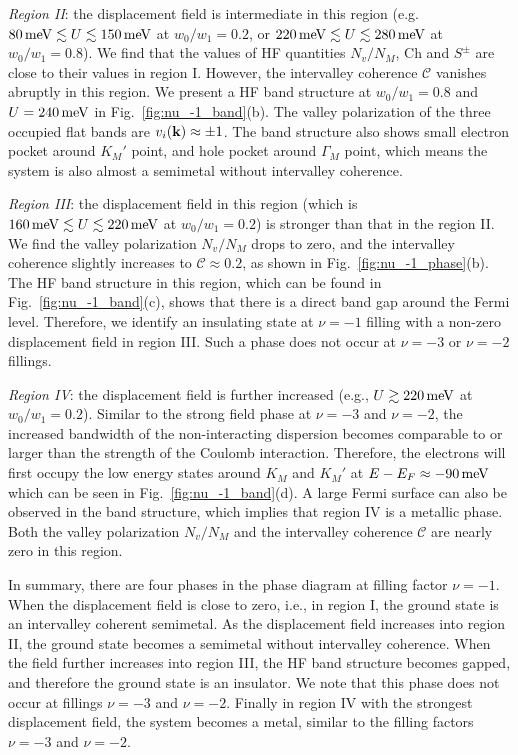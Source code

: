\documentclass[prb,aps,nofootinbib,amssymb,twocolumn,superscriptaddress,10pt]{revtex4-2}
\begin{document}
{\it Region II}: the displacement field is intermediate in this region (e.g. $80{\rm\, meV} \lesssim U \lesssim 150 {\rm\, meV} $ at $w_0/w_1 = 0.2$, or $220{\rm\, meV} \lesssim U \lesssim 280 {\rm\, meV} $ at $w_0/w_1 = 0.8$). We find that the values of HF quantities $N_v/N_M$, $\mathrm{Ch}$ and $S^\pm$ are close to their values in region I. However, the intervalley coherence $\mathcal{C}$ vanishes abruptly in this region. We present a HF band structure at $w_0/w_1 = 0.8$ and $U=240\,\rm meV$ in Fig.~\ref{fig:nu_-1_band}(b). The valley polarization of the three occupied flat bands are $v_i(\mathbf{k}) \approx \pm 1$. The band structure also shows small electron pocket around $K_M'$ point, and hole pocket around $\Gamma_M$ point, which means the system is also almost a semimetal without intervalley coherence.

{\it Region III}: the displacement field in this region (which is $160{\rm\,meV} \lesssim U \lesssim 220 {\rm\,meV}$ at $w_0/w_1 = 0.2$) is stronger than that in the region II. We find the valley polarization $N_v/N_M$ drops to zero, and the intervalley coherence slightly increases to $\mathcal{C}\approx 0.2$, as shown in Fig.~\ref{fig:nu_-1_phase}(b). The HF band structure in this region, which can be found in Fig.~\ref{fig:nu_-1_band}(c), shows that there is a direct band gap around the Fermi level. Therefore, we identify an insulating state at $\nu=-1$ filling with a non-zero displacement field in region III. Such a phase does not occur at $\nu=-3$ or $\nu=-2$ fillings. 

{\it Region IV}: the displacement field is further increased (e.g., $U \gtrsim 220\,\rm meV$ at $w_0/w_1 = 0.2$). Similar to the strong field phase at $\nu=-3$ and $\nu=-2$, the increased bandwidth of the non-interacting dispersion becomes comparable to or larger than the strength of the Coulomb interaction. 
Therefore, the electrons will first occupy the low energy states around $K_M$ and $K_M'$ at $E - E_F \approx -90\,\rm meV$ which can be seen in Fig.~\ref{fig:nu_-1_band}(d).
A large Fermi surface can also be observed in the band structure, which implies that region IV is a metallic phase. Both the valley polarization $N_v/N_M$ and the intervalley coherence $\mathcal{C}$ are nearly zero in this region.

In summary, there are four phases in the phase diagram at filling factor $\nu=-1$. When the displacement field is close to zero, i.e., in region I, the ground state is an intervalley coherent semimetal. As the displacement field increases into region II, the ground state becomes a semimetal without intervalley coherence. When the field further increases into region III, the HF band structure becomes gapped, and therefore the ground state is an insulator. We note that this phase does not occur at fillings $\nu=-3$ and $\nu=-2$. Finally in region IV with the strongest displacement field, the system becomes a metal, similar to the filling factors $\nu=-3$ and $\nu=-2$.
\end{document}
